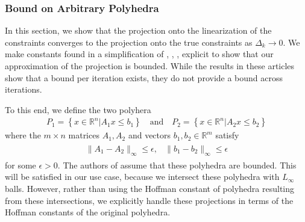 \documentclass{article}
\theoremstyle{case}
\numberwithin{theorem}{subsection}
\newcommand{\dk}{\Delta_k}
\newcommand{\Rm}{\mathbb R^m}
\newcommand{\Rn}{\mathbb R^n}
\begin{document}
\subsubsection{Bound on Arbitrary Polyhedra}
\label{bounding_projection_onto_two_polyhedra}

In this section, we show that the projection onto the linearization of the constraints converges to the projection onto the true constraints as $\dk \to 0$.
We make constants found in a simplification of 
\cite{pena2020new},
\cite{hoffman_theorem},
\cite{continuity_of_metric_projections},
\cite{perturbations_of_linear_inequalities} 
explicit to show that our approximation of the projection is bounded.
While the results in these articles show that a bound per iteration exists, they do not provide a bound across iterations.

To this end, we define the two polyhera
\begin{align}
\label{bap_define_the_polyhedra}
P_1 = \left\{ x \in \Rn | A_1x\le b_1 \right\}
\quad \textrm{and} \quad
P_2 = \left\{ x \in \Rn | A_2x\le b_2 \right\}
\end{align}
where the $m\times n$ matrices $A_1, A_2$ and vectors $b_1, b_2 \in \Rm$ satisfy
\begin{align}
\begin{array}{cc}
\|A_1 - A_2\|_{\infty} \le \epsilon, & \|b_1 - b_2\|_{\infty} \le \epsilon
\label{bap_polyhedra_are_close}
\end{array}
\end{align}
for some $\epsilon > 0$.
The authors of \cite{continuity_of_metric_projections} assume that these polyhedra are bounded.
This will be satisfied in our use case, because we intersect these polyhedra with $L_{\infty}$ balls.
However, rather than using the Hoffman constant of polyhedra resulting from these intersections,
we explicitly handle these projections in terms of the Hoffman constants of the original polyhedra.

% 
% 
% 
\end{document}
